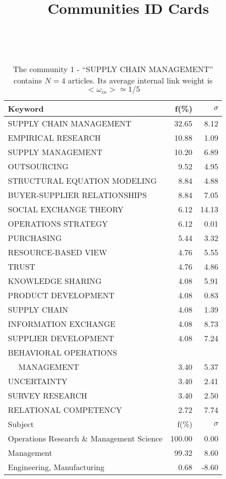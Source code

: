 \documentclass[a4paper,11pt]{report}
\title{{\bf Communities ID Cards}}
\date{\begin{flushleft}This document gather the ``ID Cards'' of the CC communities found within your database.\\
 The CC network was built by keeping a link between articles sharing at least 10 references. The communities characterized here correspond to the ones found in the level 0 (in the sense of the Louvain algo) which gathers more than 0 articles.\\
 These ID cards displays the most frequent keywords, subject categories, journals of publication, institution, countries, authors, references and reference journals of the articles of each community. The significance of an item $\sigma = \sqrt{N} (f - p) / \sqrt{p(1-p)}$ [where $N$ is the number of articles within the community and $f$ and $p$ are the proportion of articles respectively within the community and within the database displaying that item ] is also given (for example $\sigma > 5$ is really highly significant).\\
\vspace{1cm}
\copyright Sebastian Grauwin, Liu Weizhi - (2014) \end{flushleft}}
\begin{document}
\begin{landscape}
\maketitle
\clearpage

\begin{table}[!ht]
\caption{The community 1 - ``SUPPLY CHAIN MANAGEMENT'' contains $N = 4$ articles. Its average internal link weight is $<\omega_{in}> \simeq 1/5$ }
\textcolor{white}{aa}\\
{\scriptsize\begin{tabular}{|l r r|}
\hline
Keyword & f(\%) & $\sigma$\\
\hline
SUPPLY CHAIN MANAGEMENT & 32.65 & 8.12\\
EMPIRICAL RESEARCH & 10.88 & 1.09\\
SUPPLY MANAGEMENT & 10.20 & 6.89\\
OUTSOURCING & 9.52 & 4.95\\
STRUCTURAL EQUATION MODELING & 8.84 & 4.88\\
BUYER-SUPPLIER RELATIONSHIPS & 8.84 & 7.05\\
SOCIAL EXCHANGE THEORY & 6.12 & 14.13\\
OPERATIONS STRATEGY & 6.12 & 0.01\\
PURCHASING & 5.44 & 3.32\\
RESOURCE-BASED VIEW & 4.76 & 5.55\\
TRUST & 4.76 & 4.86\\
KNOWLEDGE SHARING & 4.08 & 5.91\\
PRODUCT DEVELOPMENT & 4.08 & 0.83\\
SUPPLY CHAIN & 4.08 & 1.39\\
INFORMATION EXCHANGE & 4.08 & 8.73\\
SUPPLIER DEVELOPMENT & 4.08 & 7.24\\
BEHAVIORAL OPERATIONS &  & \\
$\quad$ MANAGEMENT & 3.40 & 5.37\\
UNCERTAINTY & 3.40 & 2.41\\
SURVEY RESEARCH & 3.40 & 2.50\\
RELATIONAL COMPETENCY & 2.72 & 7.74\\
\hline
\hline
Subject & f(\%) & $\sigma$\\
\hline
Operations Research \& Management Science & 100.00 & 0.00\\
Management & 99.32 & 8.60\\
Engineering, Manufacturing & 0.68 & -8.60\\

\end{tabular}}
\end{table}
\end{landscape}
\end{document}

